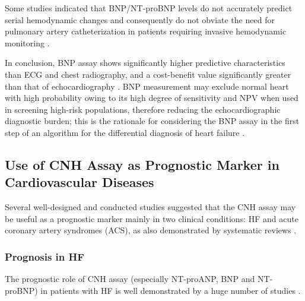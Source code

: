 \documentclass[14pt,a4paper,onecolumn]{extarticle}
\begin{document}
Some  studies indicated that BNP/NT-proBNP levels do not accurately predict serial hemodynamic changes and consequently do not obviate the need for pulmonary artery catheterization in patients requiring invasive hemodynamic monitoring \citep{bib3182} \citep{bib3183} \citep{bib3184}.

In conclusion, BNP assay shows significantly higher predictive characteristics than ECG and chest radiography, and a cost-benefit value significantly greater than that of echocardiography \citep{bib392} \citep{bib3170}. BNP measurement may exclude normal heart with high probability owing to its high degree of sensitivity and NPV when used in screening high-risk populations, therefore reducing the echocardiographic diagnostic burden; this is the rationale for considering the BNP assay in the first step of an algorithm for the differential diagnosis of heart failure \citep{bib337} \citep{bib365} \citep{bib369} \citep{bib370} \citep{bib3168} \citep{bib3175}.


\subsection{ Use of CNH Assay as Prognostic Marker in Cardiovascular Diseases}

Several well-designed and conducted studies suggested that the CNH assay may be useful as a prognostic marker mainly in two clinical conditions: HF and acute coronary artery syndromes (ACS), as also demonstrated by systematic reviews \citep{bib35} \citep{bib376} \citep{bib3184} \citep{bib3185}.

\subsubsection{ Prognosis in HF}

The prognostic role of CNH assay (especially NT-proANP, BNP and NT-proBNP) in patients with HF is well demonstrated by a huge number of studies \citep{bib316} \citep{bib3147} \citep{bib3186} \citep{bib3187} \citep{bib3188} \citep{bib3189} \citep{bib3190} \citep{bib3191} \citep{bib3192} \citep{bib3193} \citep{bib3194} \citep{bib3195} \citep{bib3206} \citep{bib3197} \citep{bib3198} \citep{bib3199}.
\end{document}
